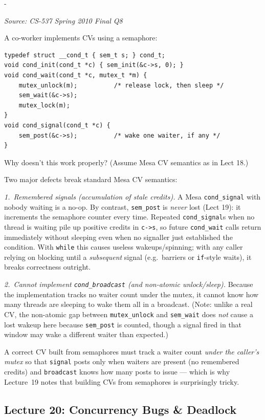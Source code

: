 \documentclass[11pt,a4paper]{article}
\makeatletter
\newcommand{\keepspace}[1]{\par\penalty-100\begingroup
  \setlength{\dimen@}{#1}\dimen@ii\pagegoal\advance\dimen@ii-\pagetotal
  \ifdim\dimen@>\dimen@ii\ifdim\dimen@ii>\z@\vfil\fi\break\fi\endgroup}
\newcounter{qn}[section]
\newenvironment{Qn}[4]{%
  \refstepcounter{qn}\keepspace{7\baselineskip}%
  \begin{tcolorbox}[qboxstyle, title={Q\thesection.\theqn\ \ [#1 \textbar\ #2]\ \ #4}]%
  {\footnotesize\color{g3}\textit{Source: #3}}\par\smallskip%
}{%
  \end{tcolorbox}%
}
\newenvironment{Sol}{%
  \begin{tcolorbox}[sboxstyle, title={Solution}]%
}{%
  \end{tcolorbox}\vspace{0.35em}%
}
\makeatother
\begin{document}
\begin{Qn}{Medium-Hard}{Lect 19}{CS-537 Spring 2010 Final Q8}{Why a condition variable built from a semaphore is buggy}
A co-worker implements CVs using a semaphore:
\begin{lstlisting}[numbers=none]
typedef struct __cond_t { sem_t s; } cond_t;
void cond_init(cond_t *c) { sem_init(&c->s, 0); }
void cond_wait(cond_t *c, mutex_t *m) {
    mutex_unlock(m);          /* release lock, then sleep */
    sem_wait(&c->s);
    mutex_lock(m);
}
void cond_signal(cond_t *c) {
    sem_post(&c->s);          /* wake one waiter, if any */
}
\end{lstlisting}
Why doesn't this work properly? (Assume Mesa CV semantics as in Lect 18.)
\end{Qn}
\begin{Sol}
Two major defects break standard Mesa CV semantics:

\emph{1.~Remembered signals (accumulation of stale credits).} A Mesa
\texttt{cond\_signal} with nobody waiting is a no-op. By contrast,
\texttt{sem\_post} is \emph{never} lost (Lect 19): it increments the
semaphore counter every time. Repeated \texttt{cond\_signal}s when no
thread is waiting pile up positive credits in \texttt{c->s}, so future
\texttt{cond\_wait} calls return immediately without sleeping even when
no signaller just established the condition. With \texttt{while} this
causes useless wakeups/spinning; with any caller relying on blocking
until a \emph{subsequent} signal (e.g.\ barriers or \texttt{if}-style
waits), it breaks correctness outright.

\emph{2.~Cannot implement \texttt{cond\_broadcast} (and non-atomic
unlock/sleep).} Because the implementation tracks no waiter count under
the mutex, it cannot know how many threads are sleeping to wake them
all in a broadcast. (Note: unlike a real CV, the non-atomic gap between
\texttt{mutex\_unlock} and \texttt{sem\_wait} does \emph{not} cause a
lost wakeup here because \texttt{sem\_post} is counted, though a signal
fired in that window may wake a different waiter than expected.)

A correct CV built from semaphores must track a waiter count \emph{under
the caller's mutex} so that \texttt{signal} posts only when waiters are
present (no remembered credits) and \texttt{broadcast} knows how many
posts to issue --- which is why Lecture~19 notes that building CVs from
semaphores is surprisingly tricky.
\end{Sol}

\subsection{Lecture 20: Concurrency Bugs \& Deadlock}
\end{document}
